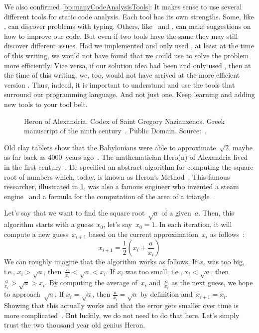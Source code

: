 We also confirmed \cref{bp:manyCodeAnalysisTools}:
It makes sense to use several different tools for static code analysis.
Each tool has its own strengths.
Some, like \mypy, can discover problems with typing.
Others, like \ruff\ and \pylint, can make suggestions on how to improve our code.
But even if two tools have the same  they may still discover different issues.
Had we implemented  and only used \ruff, at least at the time of this writing, we would not have found that we could use  to solve the problem more efficiently.
Vice versa, if our solution idea had been  and only used \pylint, then at the time of this writing, we, too, would not have arrived at the more efficient version .
Thus, indeed, it is important to understand and use the tools that surround our programming language.
And not just one.
Keep learning and adding new tools to your tool belt.%
%
\FloatBarrier%
\endhsection%
%
%
\label{sec:whileLoop}%
%
\begin{figure}%
\centering%
%
\caption{Heron of Alexandria. %
Codex of Saint Gregory Nazianzenos. Greek manuscript of the ninth century~. %
Public Domain. %
Source:~\cite{GR:TAGWITWFST}.%
}%
\label{fig:heronOfAlexandria}%
\end{figure}%
%
Old clay tablets show that the Babylonians were able to approximate~$\sqrt{2}$ maybe as far back as 4000~years ago~\cite{FR1998SRAIOBMY7IC,S2011NA:NA}.
The mathematician Hero(n) of Alexandria lived in the first century~.
He specified an abstract algorithm for computing the square root of numbers which, today, is known as Heron's Method~\cite{S2011NA:NA,K2009BMOCTSRJBOFTAOCC}.
This famous researcher, illustrated in \cref{fig:heronOfAlexandria}, was also a famous engineer who invented a steam engine~\cite{GR:TAGWITWFST} and a formula for the computation of the area of a triangle~\cite{L2020RWECSSKAFPA}.

Let's say that we want to find the square root~$\sqrt{a}$ of a given~$a$.
Then, this algorithm starts with a guess~$x_0$, let's say~$x_0=1$.
In each iteration, it will compute a new guess~$x_{i+1}$ based on the current approximation~$x_i$ as follows~\cite{S2011NA:NA,K2009BMOCTSRJBOFTAOCC}:%
%
\begin{equation}%
x_{i+1}=\frac{1}{2}\left(x_i+\frac{a}{x_i}\right)%
\label{eq:heronGuessUpdate}%
\end{equation}%
%
We can roughly imagine that the algorithm works as follows:
If $x_i$ was too big, i.e., $x_i>\sqrt{a}$, then~$\frac{a}{x_i}<\sqrt{a}<x_i$.
If $x_i$ was too small, i.e., $x_i<\sqrt{a}$, then $\frac{a}{x_i}>\sqrt{a}>x_i$.
By computing the average of~$x_i$ and~$\frac{a}{x_i}$ as the next guess, we hope to approach~$\sqrt{a}$.
If $x_i=\sqrt{a}$, then $\frac{a}{x_i}=\sqrt{a}$ by definition and~$x_{i+1}=x_i$.
Showing that this actually works and that the error gets smaller over time is more complicated~\cite{S2011NA:NA}.
But luckily, we do not need to do that here.
Let's simply trust the two thousand year old genius Heron.

